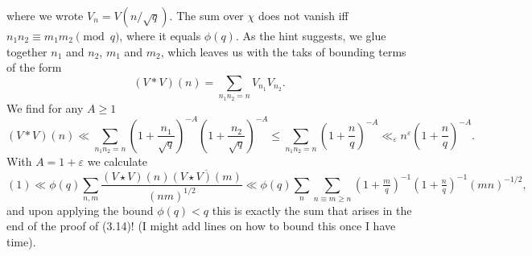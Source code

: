 \documentclass[a4paper,11pt]{article}
\begin{document}
where we wrote $V_n = V(n/\sqrt q)$.
The sum over $\chi$ does not vanish iff $n_1n_2 \equiv m_1m_2 \pmod q$, 
where it equals $\phi(q)$. As the hint suggests, we glue together $n_1$ and $n_2$,
$m_1$ and $m_2$, which leaves us with the taks of bounding terms of the form
\[
    (V * V)(n) = \sum_{n_1 n_2 = n} V_{n_1} V_{n_2}.
\]
We find for any $A \geq 1$
\[
    (V * V)(n) \ll \sum_{n_1n_2 = n} \left(1+\frac {n_1} {\sqrt q} \right)^{-A}
    \left(1+\frac {n_2} {\sqrt q} \right)^{-A} \leq 
    \sum_{n_1 n_2 = n} \left(1+\frac {n} {q} \right)^{-A}
    \ll_{\varepsilon}n^{\varepsilon} \left(1+\frac {n} {q} \right)^{-A}.
\]
With $A = 1+\varepsilon$ we calculate
\begin{equation}
    (1) \ll \phi(q) \sum_{n,m} \frac{(V\star V)(n) \overline{(V\star V)(m)}}{(nm)^{1/2}}
    \ll \phi(q) \sum_n \sum_{n \equiv m \geq n} 
    (1+\tfrac mq)^{-1} (1+\tfrac nq)^{-1} (mn)^{-1/2},
\end{equation}
and upon applying the bound $\phi(q) < q$ this is exactly the sum that
arises in the end of the proof of (3.14)! (I might add lines on how to bound
this once I have time).
 
\end{document}
